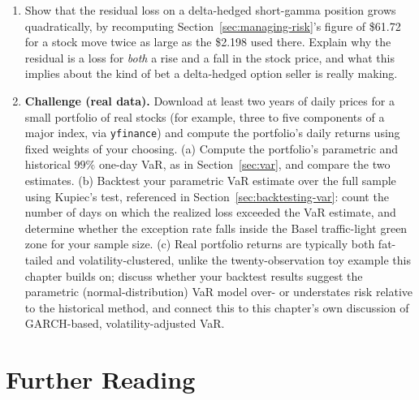 \documentclass[../ai_in_finance]{subfiles}
\begin{document}
\begin{enumerate}
    \item Show that the residual loss on a delta-hedged short-gamma position grows quadratically, by recomputing Section~\ref{sec:managing-risk}'s figure of \$61.72 for a stock move twice as large as the \$2.198 used there. Explain why the residual is a loss for \emph{both} a rise and a fall in the stock price, and what this implies about the kind of bet a delta-hedged option seller is really making.
    \item \textbf{Challenge (real data).} Download at least two years of daily prices for a small portfolio of real stocks (for example, three to five components of a major index, via \texttt{yfinance}) and compute the portfolio's daily returns using fixed weights of your choosing. (a) Compute the portfolio's parametric and historical $99\%$ one-day VaR, as in Section~\ref{sec:var}, and compare the two estimates. (b) Backtest your parametric VaR estimate over the full sample using Kupiec's test, referenced in Section~\ref{sec:backtesting-var}: count the number of days on which the realized loss exceeded the VaR estimate, and determine whether the exception rate falls inside the Basel traffic-light green zone for your sample size. (c) Real portfolio returns are typically both fat-tailed and volatility-clustered, unlike the twenty-observation toy example this chapter builds on; discuss whether your backtest results suggest the parametric (normal-distribution) VaR model over- or understates risk relative to the historical method, and connect this to this chapter's own discussion of GARCH-based, volatility-adjusted VaR.
\end{enumerate}

\section{Further Reading}
\end{document}
